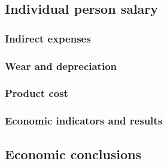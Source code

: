 \subsection{Individual person salary}
\subsubsection{Indirect expenses}
\subsubsection{Wear and depreciation}
\subsubsection{Product cost}
\subsubsection{Economic indicators and results}
\subsection{Economic conclusions}
